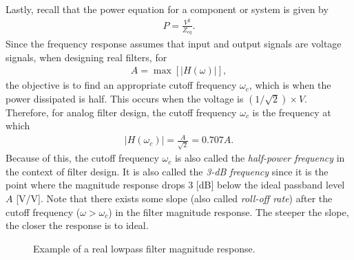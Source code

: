 \documentclass{report}
\begin{document}
\noindent Lastly, recall that the power equation for a component or system is given by 
\begin{align}
    P = \frac{V^2}{Z_{eq}}.
\end{align}
Since the frequency response assumes that input and output signals are voltage signals, when designing real filters, for 
\begin{align}
    A = \max[|H(\omega)|],
\end{align}
the objective is to find an appropriate cutoff frequency $\omega_c$, which is when the power dissipated is half. This occurs 
when the voltage is $(1/\sqrt{2})\times V$. Therefore, for analog filter design, the cutoff frequency $\omega_c$ is the frequency at which 
\begin{align}
    |H(\omega_c)| = \frac{A}{\sqrt{2}} = 0.707A.
\end{align}
Because of this, the cutoff frequency $\omega_c$ is also called the \emph{half-power frequency} in the context of filter design. It is also called the \emph{3-dB frequency} 
since it is the point where the magnitude response drops 3 [dB] below the ideal passband level $A$ [V/V]. Note that there exists some slope (also called \emph{roll-off rate}) after the 
cutoff frequency ($\omega>\omega_c$) in the filter magnitude response. The steeper the slope, the closer the response is to ideal.
\begin{figure}[!hbt]
    \centering
    \caption{Example of a real lowpass filter magnitude response.}
    \label{lpf_ex}
\end{figure}
\end{document}
